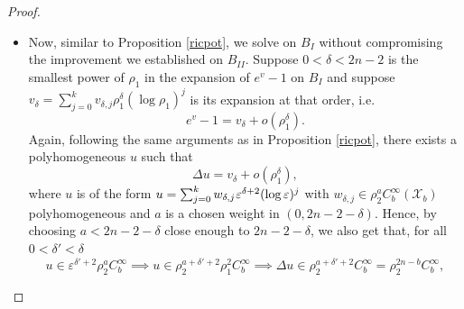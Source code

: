 \documentclass[a4paper,11pt]{article}
\begin{document}
\begin{proof}
\begin{itemize}
\item Now, similar to Proposition \ref{ricpot}, we solve on $B_{I}$ without compromising the improvement we established on $B_{II}$. Suppose $0< \delta< 2n -2 $ is the smallest power of $\rho_1$ in the expansion of $e^v -1$ on $B_{I}$ and suppose $v_\delta =\sum_{j=0}^k v_{\delta,j} \rho_1^{\delta} (\log \rho_1)^j$ is its expansion at that order, i.e.
$$
e^v -1 = v_\delta + o(\rho_1^\delta).
$$
Again, following the same arguments as in Proposition \ref{ricpot}, there exists a polyhomogeneous $u$ such that 
$$
\Delta u = v_\delta + o(\rho_1^{\delta}), 
$$
where $u$ is of the form $u=\sum_{j=0}^k w_{\delta,j} \hspace{0.02cm} \varepsilon^{\delta+2} (\log \varepsilon)^j$ with $w_{\delta,j} \in \rho_2^{a} C^\infty_b(\mathcal{X}_b)$ polyhomogeneous and $a$ is a chosen weight in $(0,2n-2-\delta)$. Hence, by choosing $a < 2n-2-\delta$ close enough to $2n-2-\delta$, we also get that, for all $0<\delta' < \delta$  
$$
u \in \varepsilon^{\delta' +2} \rho_2^a C_b^\infty \implies u \in \rho_2^{a+ \delta' +2} \rho_1^2 C_b^\infty \implies \Delta u \in \rho_2^{a+ \delta' +2} C_b^\infty = \rho_2^{2n - b} C_b^\infty, 
$$


\end{itemize}
\end{proof}
\end{document}
